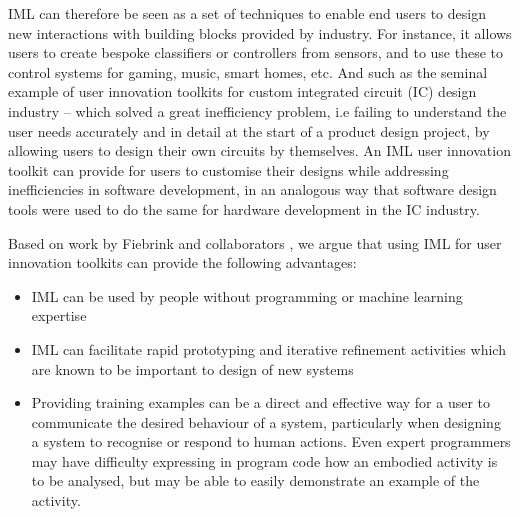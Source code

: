 \documentclass[letterpaper]{article}
\begin{document}
IML can therefore be seen as a set of techniques to enable end users to design new interactions with building blocks provided by industry. For instance, it allows users to create bespoke classifiers or controllers from sensors, and to use these to control systems for gaming, music, smart homes, etc. And such as the seminal example of user innovation toolkits for custom integrated circuit (IC) design industry \cite{hippel2001user} -- which solved a great inefficiency problem, i.e failing to understand the user needs accurately and in detail at the start of a product design project, by allowing users to design their own circuits by themselves. An IML user innovation toolkit can provide for users to customise their designs while addressing inefficiencies in software development, in an analogous way that software design tools were used to do the same for hardware development in the IC industry.





Based on work by Fiebrink and collaborators \cite{fiebrink2011human,fiebrink2010toward,fiebrink2011real}, we argue that using IML for user innovation toolkits can provide the following advantages:
\begin{itemize}
\item IML can be used by people without programming or machine learning expertise
\item IML can facilitate rapid prototyping and iterative refinement activities which are known to be important to design of new systems
\item Providing training examples can be a direct and effective way for a user to communicate the desired behaviour of a system, particularly when designing a system to recognise or respond to human actions. Even expert programmers may have difficulty expressing in program code how an embodied activity is to be analysed, but may be able to easily demonstrate an example of the activity.
\end{itemize}
\end{document}
